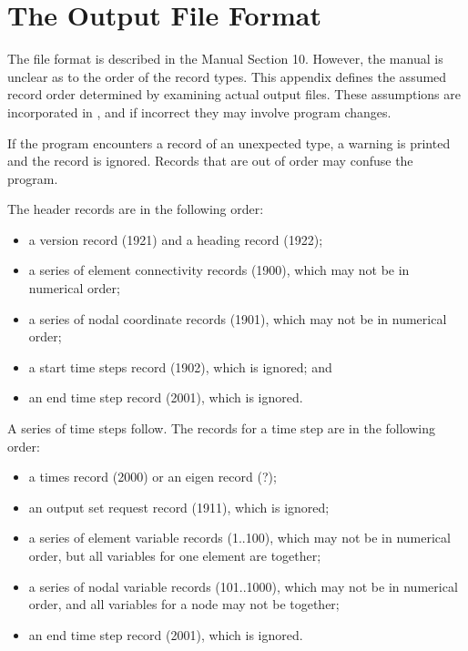 \chapter{The  Output File Format} \label{appx:abaqus}

The  file format is described in the  Manual
Section 10. However, the manual is unclear as to the order of the record
types. This appendix defines the assumed record order determined by
examining actual  output files. These assumptions are
incorporated in \caps{\PROGRAM}, and if incorrect they may involve
program changes.

If the program encounters a record of an unexpected type, a warning is
printed and the record is ignored. Records that are out of order may
confuse the program.

The header records are in the following order:
\setlength{\itemsep}{\medskipamount} \begin{itemize}
\item a version record (1921) and a heading record (1922);
\item a series of element connectivity records (1900), which may not be
in numerical order;
\item a series of nodal coordinate records (1901), which may not be in
numerical order;
\item a start time steps record (1902), which is ignored; and
\item an end time step record (2001), which is ignored.
\end{itemize}

A series of time steps follow. The records for a time step are in the
following order:
\setlength{\itemsep}{\medskipamount} \begin{itemize}
\item a times record (2000) or an eigen record (?);
\item an output set request record (1911), which is ignored;
\item a series of element variable records (1..100), which may not be in
numerical order, but all variables for one element are together;
\item a series of nodal variable records (101..1000), which may not be in
numerical order, and all variables for a node may not be together;
\item an end time step record (2001), which is ignored.
\end{itemize}
